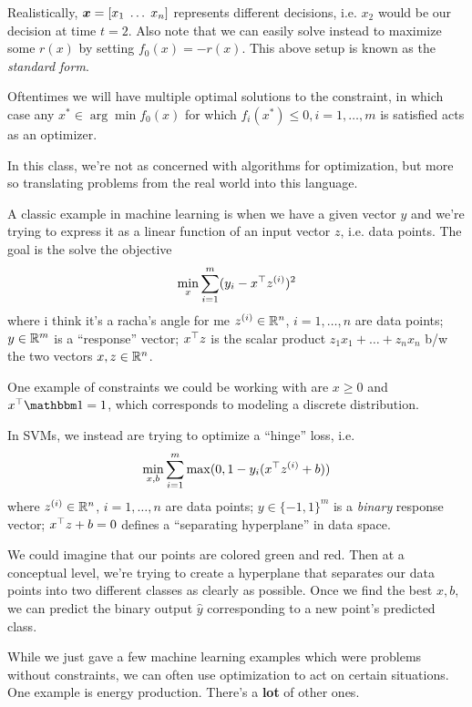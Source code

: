 \documentclass[11 pt]{scrartcl}
\begin{document}
Realistically, ${\bm{x}} = [x_1\; \dots\; x_n]$ represents different decisions, i.e. $x_2$ would be our decision at time $t=2$. 
Also note that we can easily solve instead to maximize some $r(x)$ by setting $f_0(x) = -r(x)$. 
This above setup is known as the \emph{standard form}. 

Oftentimes we will have multiple optimal solutions to the constraint, in which case any $x^* \in \arg\min f_0(x)$ for which $f_i(x^*) \leq 0, i=1, \dots, m$ is satisfied acts as an optimizer.

In this class, we're not as concerned with algorithms for optimization, but more so translating problems from the real world into this language. 

\begin{example}
A classic example in machine learning is when we have a given vector $y$ and we're trying to express it as a linear function of an input vector $z$, i.e. data points. 
The goal is the solve the objective 
\[ \min_x \sum_{i=1}^m (y_i - x^\top z^{(i)})^2\] 
where i think it’s a racha’s angle for me
\itemnum
    \ii $z^{(i)}\in \mathbb R^n$, $i=1, \dots, n$ are data points; 
    \ii $y\in \mathbb R^m$ is a ``response'' vector; 
    \ii $x^\top z$ is the scalar product $z_1x_1+\dots + z_nx_n$ b/w the two vectors $x,z \in \mathbb R^n$. 
\itemend

One example of constraints we could be working with are $x\geq 0$ and $x^\T \one = 1$, which corresponds to modeling a discrete distribution.

\end{example}

\begin{example}
In SVMs, we instead are trying to optimize a ``hinge'' loss, i.e. 
\[ \min_{x,b} \sum_{i=1}^m \max(0, 1-y_i(x^\top z^{(i)} + b))\] 
where 
\itemnum
    \ii $z^{(i)}\in \mathbb R^n$, $i=1, \dots, n$ are data points; 
    \ii $y\in \{-1, 1\}^m$ is a \emph{binary} response vector; 
    \ii $x^\top z + b = 0$ defines a ``separating hyperplane'' in data space. 
\itemend

We could imagine that our points are colored green and red.
Then at a conceptual level, we're trying to create a hyperplane that separates our data points into two different classes as clearly as possible. 
Once we find the best $x,b$, we can predict the binary output $\hat{y}$ corresponding to a new point's predicted class.
\end{example}

While we just gave a few machine learning examples which were problems without constraints, we can often use optimization to act on certain situations. 
One example is energy production. 
There's a \textbf{lot} of other ones. 
\end{document}
